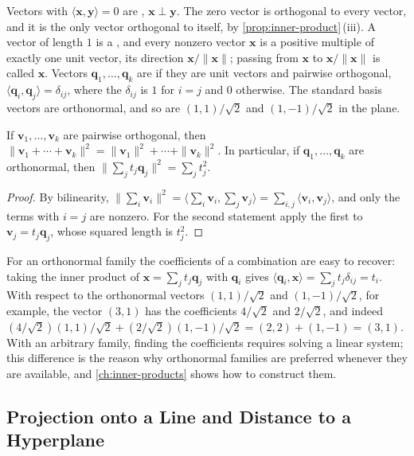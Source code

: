 Vectors with $\langle\mathbf x,\mathbf y\rangle=0$ are , $\mathbf x\perp\mathbf y$. The zero vector is orthogonal to every vector, and it is the only vector orthogonal to itself, by \cref{prop:inner-product}\,(iii). A vector of length $1$ is a , and every nonzero vector $\mathbf x$ is a positive multiple of exactly one unit vector, its direction $\mathbf x/\|\mathbf x\|$; passing from $\mathbf x$ to $\mathbf x/\|\mathbf x\|$ is called  $\mathbf x$. Vectors $\mathbf q_1,\ldots,\mathbf q_k$ are  if they are unit vectors and pairwise orthogonal, $\langle\mathbf q_i,\mathbf q_j\rangle=\delta_{ij}$, where the  $\delta_{ij}$ is $1$ for $i=j$ and $0$ otherwise. The standard basis vectors are orthonormal, and so are $(1,1)/\sqrt2$ and $(1,-1)/\sqrt2$ in the plane.

\begin{proposition}
\label{prop:pythagoras}
If $\mathbf v_1,\ldots,\mathbf v_k$ are pairwise orthogonal, then $\|\mathbf v_1+\cdots+\mathbf v_k\|^2=\|\mathbf v_1\|^2+\cdots+\|\mathbf v_k\|^2$. In particular, if $\mathbf q_1,\ldots,\mathbf q_k$ are orthonormal, then $\bigl\|\sum_jt_j\mathbf q_j\bigr\|^2=\sum_jt_j^2$.
\end{proposition}

\begin{proof}
By bilinearity, $\bigl\|\sum_i\mathbf v_i\bigr\|^2=\bigl\langle\sum_i\mathbf v_i,\sum_j\mathbf v_j\bigr\rangle=\sum_{i,j}\langle\mathbf v_i,\mathbf v_j\rangle$, and only the terms with $i=j$ are nonzero. For the second statement apply the first to $\mathbf v_j=t_j\mathbf q_j$, whose squared length is $t_j^2$.
\end{proof}

For an orthonormal family the coefficients of a combination are easy to recover: taking the inner product of $\mathbf x=\sum_jt_j\mathbf q_j$ with $\mathbf q_i$ gives $\langle\mathbf q_i,\mathbf x\rangle=\sum_jt_j\delta_{ij}=t_i$. With respect to the orthonormal vectors $(1,1)/\sqrt2$ and $(1,-1)/\sqrt2$, for example, the vector $(3,1)$ has the coefficients $4/\sqrt2$ and $2/\sqrt2$, and indeed $(4/\sqrt2)(1,1)/\sqrt2+(2/\sqrt2)(1,-1)/\sqrt2=(2,2)+(1,-1)=(3,1)$. With an arbitrary family, finding the coefficients requires solving a linear system; this difference is the reason why orthonormal families are preferred whenever they are available, and \cref{ch:inner-products} shows how to construct them.

\subsection{Projection onto a Line and Distance to a Hyperplane}

